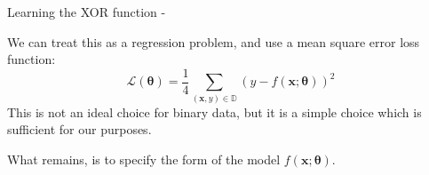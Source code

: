 \begin{frame}[t,allowframebreaks]{Learning the XOR function -}
\framebreak

    We can treat this as a regression problem, and use a 
    \gls{mean square error loss function}:
    \begin{equation}
        \mathcal{L}(\mathbf{\theta}) =  
        \frac{1}{4} 
        \sum_{(\mathbf{x},y) \in \mathbb{D}} 
        (y - f(\mathbf{x};\mathbf{\theta}))^2
        \label{eq:learn_xor_loss_function_1}
    \end{equation}
    This is not an ideal choice for binary data,
    but it is a simple choice which is sufficient for our purposes.\\
    \vspace{0.2cm}

    What remains, is to specify the form of the model 
    $f(\mathbf{x};\mathbf{\theta})$.

\end{frame}
